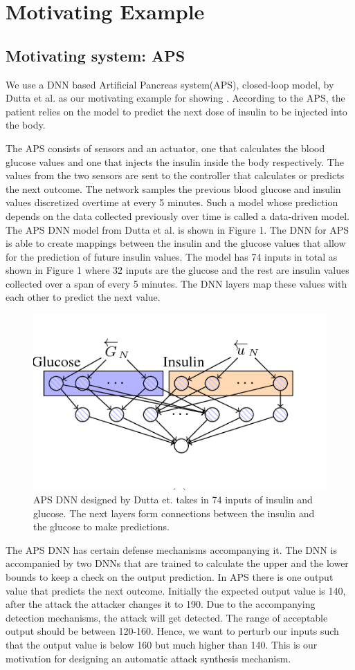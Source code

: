 \chapter{Motivating Example}
\label{ch:Chapter2}
\section{Motivating system: APS}
We use a DNN based Artificial Pancreas system(APS), closed-loop model, by Dutta et al. \cite{10.1007/978-3-319-99429-1_11}  as our motivating example for showing \attack. According to the APS, the patient relies on the model to predict the next dose of insulin to be injected into the body. 

The APS consists of sensors and an actuator, one that calculates the blood glucose values and one that injects the insulin inside the body respectively. The values from the two sensors are sent to the controller that calculates or predicts the next outcome. The network samples the previous blood glucose and insulin values discretized overtime at every 5 minutes. Such a model whose prediction depends on the data collected previously over time is called a data-driven model. The APS DNN model from Dutta et al. is shown in Figure 1. The DNN for APS is able to create mappings between the insulin and the glucose values that allow for the prediction of future insulin values. The model has 74 inputs in total as shown in Figure 1 where 32 inputs are the glucose and the rest are insulin values collected over a span of every 5 minutes. The DNN layers map these values with each other to predict the next value. 
\begin{figure}
	\centering
	\includegraphics[width=0.7\linewidth, height=0.3\linewidth]{Images/APSDNN}
	\caption[APS DNN]{APS DNN designed by Dutta et. takes in 74 inputs of insulin and glucose. The next layers form connections between the insulin and the glucose to make predictions.}
	\label{fig:apsdnn}
\end{figure}

The APS DNN has certain defense mechanisms accompanying it. The DNN is accompanied by two DNNs that are trained to calculate the upper and the lower bounds to keep a check on the output prediction. In APS there is one output value that predicts the next outcome. Initially the expected output value is 140, after the attack the attacker changes it to 190. Due to the accompanying detection mechanisms, the attack will get detected. The range of acceptable output should be between 120-160. Hence, we want to perturb our inputs such that the output value is below 160 but much higher than 140. This is our motivation for designing an automatic attack synthesis mechanism. 

